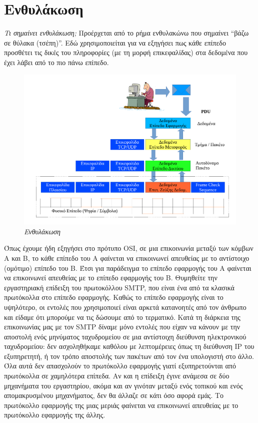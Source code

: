 %
%
%
\setcounter{section}{2}
%
\section{Ενθυλάκωση}
\begin{inthebox}
\emph{Τι σημαίνει ενθυλάκωση;} Προέρχεται από το ρήμα ενθυλακώνω που σημαίνει ``βάζω σε θύλακα (τσέπη)''. Εδώ χρησιμοποιείται για να εξηγήσει πως κάθε επίπεδο προσθέτει τις δικές του πληροφορίες (με τη μορφή επικεφαλίδας) στα δεδομένα που έχει λάβει από το πιο πάνω επίπεδο.\\
\end{inthebox}

\begin{figure}[!ht]
  \centering
  \includegraphics[width=1.00\textwidth]{images/chapter1/1-3}
  \caption {\textsl{Ενθυλάκωση}}
  \label{1-3}
\end{figure}

Όπως έχουμε ήδη εξηγήσει στο πρότυπο OSI, σε μια επικοινωνία μεταξύ των κόμβων Α και Β, το κάθε επίπεδο του Α φαίνεται να επικοινωνεί απευθείας με το αντίστοιχο (ομότιμο) επίπεδο του Β. Έτσι για παράδειγμα το επίπεδο εφαρμογής του Α φαίνεται να επικοινωνεί απευθείας με το επίπεδο εφαρμογής του Β. Θυμηθείτε την εργαστηριακή επίδειξη του πρωτοκόλλου SMTP, που είναι ένα από τα κλασικά πρωτόκολλα στο επίπεδο εφαρμογής. Καθώς το επίπεδο εφαρμογής είναι το υψηλότερο, οι εντολές που χρησιμοποιεί είναι αρκετά κατανοητές από τον άνθρωπο και είδαμε ότι μπορούμε να τις δώσουμε από το τερματικό. Κατά τη διάρκεια της επικοινωνίας μας με τον SMTP δίναμε μόνο εντολές που είχαν να κάνουν με την αποστολή ενός μηνύματος ταχυδρομείου σε μια αντίστοιχη διεύθυνση ηλεκτρονικού ταχυδρομείου: δεν ασχοληθήκαμε καθόλου με λεπτομέρειες όπως τη διεύθυνση IP του εξυπηρετητή, ή τον τρόπο αποστολής των πακέτων από τον ένα υπολογιστή στο άλλο. Όλα αυτά δεν απασχολούν το πρωτόκολλο εφαρμογής γιατί εξυπηρετούνται από πρωτόκολλα σε χαμηλότερα επίπεδα. Αν και η επίδειξη έγινε ανάμεσα σε δύο μηχανήματα του εργαστηρίου, ακόμα και αν γινόταν μεταξύ ενός τοπικού και ενός απομακρυσμένου μηχανήματος, δεν θα άλλαζε σε κάτι όσο αφορά εμάς. Το πρωτόκολλο εφαρμογής της μιας μεριάς φαίνεται να επικοινωνεί απευθείας με το πρωτόκολλο εφαρμογής της άλλης.

